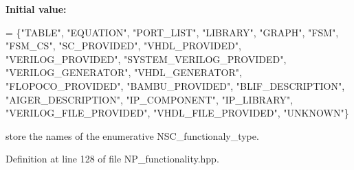 {\bfseries Initial value\+:}
\begin{DoxyCode}
= \{\textcolor{stringliteral}{"TABLE"},
                                                            \textcolor{stringliteral}{"EQUATION"},
                                                            \textcolor{stringliteral}{"PORT\_LIST"},
                                                            \textcolor{stringliteral}{"LIBRARY"},
                                                            \textcolor{stringliteral}{"GRAPH"},
                                                            \textcolor{stringliteral}{"FSM"},
                                                            \textcolor{stringliteral}{"FSM\_CS"},
                                                            \textcolor{stringliteral}{"SC\_PROVIDED"},
                                                            \textcolor{stringliteral}{"VHDL\_PROVIDED"},
                                                            \textcolor{stringliteral}{"VERILOG\_PROVIDED"},
                                                            \textcolor{stringliteral}{"SYSTEM\_VERILOG\_PROVIDED"},
                                                            \textcolor{stringliteral}{"VERILOG\_GENERATOR"},
                                                            \textcolor{stringliteral}{"VHDL\_GENERATOR"},
                                                            \textcolor{stringliteral}{"FLOPOCO\_PROVIDED"},
                                                            \textcolor{stringliteral}{"BAMBU\_PROVIDED"},
                                                            \textcolor{stringliteral}{"BLIF\_DESCRIPTION"},
                                                            \textcolor{stringliteral}{"AIGER\_DESCRIPTION"},
                                                            \textcolor{stringliteral}{"IP\_COMPONENT"},
                                                            \textcolor{stringliteral}{"IP\_LIBRARY"},
                                                            \textcolor{stringliteral}{"VERILOG\_FILE\_PROVIDED"},
                                                            \textcolor{stringliteral}{"VHDL\_FILE\_PROVIDED"},
                                                            \textcolor{stringliteral}{"UNKNOWN"}\}
\end{DoxyCode}


store the names of the enumerative N\+S\+C\+\_\+functionaly\+\_\+type. 



Definition at line 128 of file N\+P\+\_\+functionality.\+hpp.



